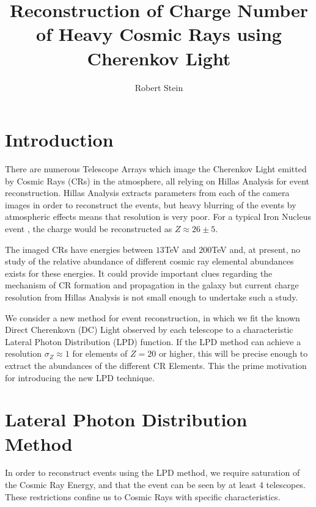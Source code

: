 \documentclass{article}
\begin{document}
\title{Reconstruction of Charge Number of Heavy Cosmic Rays using Cherenkov Light}
\author{Robert Stein}
\maketitle
\section{Introduction}
There are numerous Telescope Arrays which image the Cherenkov Light emitted by Cosmic Rays (CRs) in the atmosphere, all relying on Hillas Analysis for event reconstruction. Hillas Analysis extracts parameters from each of the camera images in order to reconstruct the events, but heavy blurring of the events by atmospheric effects means that resolution is very poor. For a typical Iron Nucleus event \cite{hess07}, the charge would be reconstructed as $Z \approx 26 \pm 5 $.

The imaged CRs have energies between $13 $TeV and $200 $TeV and, at present, no study of the relative abundance of different cosmic ray elemental abundances exists for these energies. It could provide important clues regarding the mechanism of CR formation and propagation in the galaxy but current charge resolution from Hillas Analysis is not small enough to undertake such a study.

We consider a new method for event reconstruction, in which we fit the known Direct Cherenkovn (DC) Light observed by each telescope to a characteristic Lateral Photon Distribution (LPD) function. If the LPD method can achieve a resolution $ \sigma_{Z} \approx 1 $ for elements of $Z = 20$ or higher, this will be precise enough to extract the abundances of the different CR Elements. This the prime motivation for introducing the new LPD technique.

\section{Lateral Photon Distribution Method}
In order to reconstruct events using the LPD method, we require saturation of the Cosmic Ray Energy, and that the event can be seen by at least 4 telescopes. These restrictions confine us to Cosmic Rays with specific characteristics.
\end{document}

